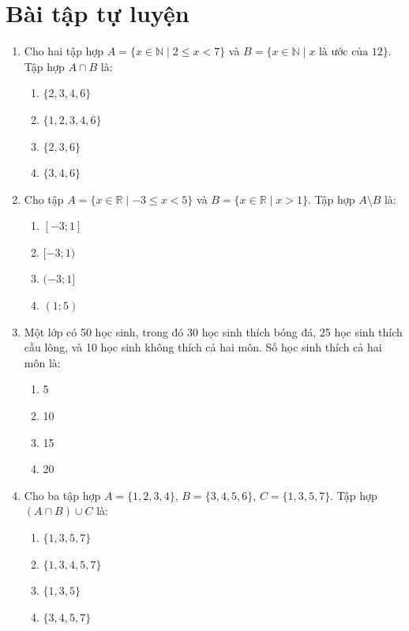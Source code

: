 \documentclass[12pt, a4paper]{report}
\begin{document}
\section{Bài tập tự luyện}

\begin{baitap}
  \begin{enumerate}[label=\textbf{Câu \arabic*.}, leftmargin=*, itemindent=0pt]
    \item Cho hai tập hợp \(A = \{x \in \mathbb{N} \mid 2 \leq x < 7\}\) và \(B = \{x \in \mathbb{N} \mid x \text{ là ước của } 12\}\). Tập hợp \(A \cap B\) là:
    \begin{enumerate}[label=\Alph*.]
      \item \(\{2, 3, 4, 6\}\)
      \item \(\{1, 2, 3, 4, 6\}\)
      \item \(\{2, 3, 6\}\)
      \item \(\{3, 4, 6\}\)
    \end{enumerate}

    \item Cho tập \(A = \{x \in \mathbb{R} \mid -3 \leq x < 5\}\) và \(B = \{x \in \mathbb{R} \mid x > 1\}\). Tập hợp \(A \setminus B\) là:
    \begin{enumerate}[label=\Alph*.]
      \item \([-3; 1]\)
      \item \([-3; 1)\)
      \item \((-3; 1]\)
      \item \((1; 5)\)
    \end{enumerate}

    \item Một lớp có 50 học sinh, trong đó 30 học sinh thích bóng đá, 25 học sinh thích cầu lông, và 10 học sinh không thích cả hai môn. Số học sinh thích cả hai môn là:
    \begin{enumerate}[label=\Alph*.]
      \item 5
      \item 10
      \item 15
      \item 20
    \end{enumerate}

    \item Cho ba tập hợp \(A = \{1, 2, 3, 4\}\), \(B = \{3, 4, 5, 6\}\), \(C = \{1, 3, 5, 7\}\). Tập hợp \((A \cap B) \cup C\) là:
    \begin{enumerate}[label=\Alph*.]
      \item \(\{1, 3, 5, 7\}\)
      \item \(\{1, 3, 4, 5, 7\}\)
      \item \(\{1, 3, 5\}\)
      \item \(\{3, 4, 5, 7\}\)
    \end{enumerate}


\end{enumerate}
\end{baitap}
\end{document}
